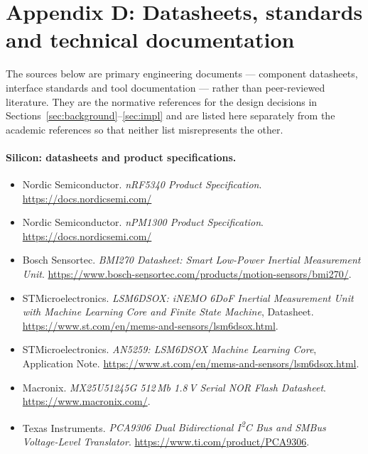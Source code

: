 \documentclass[12pt, a4paper]{article}
\begin{document}
\section{Appendix D: Datasheets, standards and technical documentation}
\label{app:datasheets}
\sloppy

The sources below are primary engineering documents --- component datasheets,
interface standards and tool documentation --- rather than peer-reviewed
literature. They are the normative references for the design decisions in
Sections~\ref{sec:background}--\ref{sec:impl} and are listed here separately from
the academic references so that neither list misrepresents the other.

\paragraph{Silicon: datasheets and product specifications.}
\begin{itemize}\setlength{\itemsep}{2pt}
  \item Nordic Semiconductor. \emph{nRF5340 Product Specification}. \url{https://docs.nordicsemi.com/}
  \item Nordic Semiconductor. \emph{nPM1300 Product Specification}. \url{https://docs.nordicsemi.com/}
  \item Bosch Sensortec. \emph{BMI270 Datasheet: Smart Low-Power Inertial Measurement Unit}. \url{https://www.bosch-sensortec.com/products/motion-sensors/bmi270/}.
  \item STMicroelectronics. \emph{LSM6DSOX: iNEMO 6DoF Inertial Measurement Unit with Machine Learning Core and Finite State Machine}, Datasheet. \url{https://www.st.com/en/mems-and-sensors/lsm6dsox.html}.
  \item STMicroelectronics. \emph{AN5259: LSM6DSOX Machine Learning Core}, Application Note. \url{https://www.st.com/en/mems-and-sensors/lsm6dsox.html}.
  \item Macronix. \emph{MX25U51245G 512\,Mb 1.8\,V Serial NOR Flash Datasheet}. \url{https://www.macronix.com/}.
  \item Texas Instruments. \emph{PCA9306 Dual Bidirectional I\textsuperscript{2}C Bus and SMBus Voltage-Level Translator}. \url{https://www.ti.com/product/PCA9306}.
\end{itemize}
\end{document}
